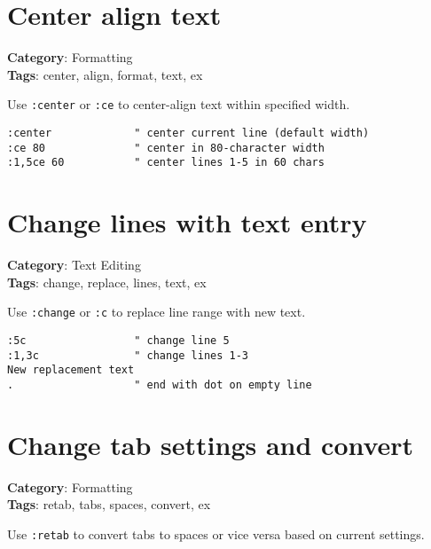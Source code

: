 {{{{\section{Center align text}

\textbf{Category}: Formatting\\ \textbf{Tags}: center, align, format, text, ex
\vspace{0.5cm}

Use {\footnotesize \Verb§:center§} or {\footnotesize \Verb§:ce§} to center-align text within specified width.

\begin{Exa*}{}
\begin{Verbatim}[fontsize=\footnotesize, breaklines, breakanywhere]
:center             " center current line (default width)
:ce 80              " center in 80-character width
:1,5ce 60           " center lines 1-5 in 60 chars
\end{Verbatim}
\end{Exa*}

\section{Change lines with text entry}

\textbf{Category}: Text Editing\\ \textbf{Tags}: change, replace, lines, text, ex
\vspace{0.5cm}

Use {\footnotesize \Verb§:change§} or {\footnotesize \Verb§:c§} to replace line range with new text.

\begin{Exa*}{}
\begin{Verbatim}[fontsize=\footnotesize, breaklines, breakanywhere]
:5c                 " change line 5
:1,3c               " change lines 1-3
New replacement text
.                   " end with dot on empty line
\end{Verbatim}
\end{Exa*}

\section{Change tab settings and convert}

\textbf{Category}: Formatting\\ \textbf{Tags}: retab, tabs, spaces, convert, ex
\vspace{0.5cm}

Use {\footnotesize \Verb§:retab§} to convert tabs to spaces or vice versa based on current settings.

}}}}
